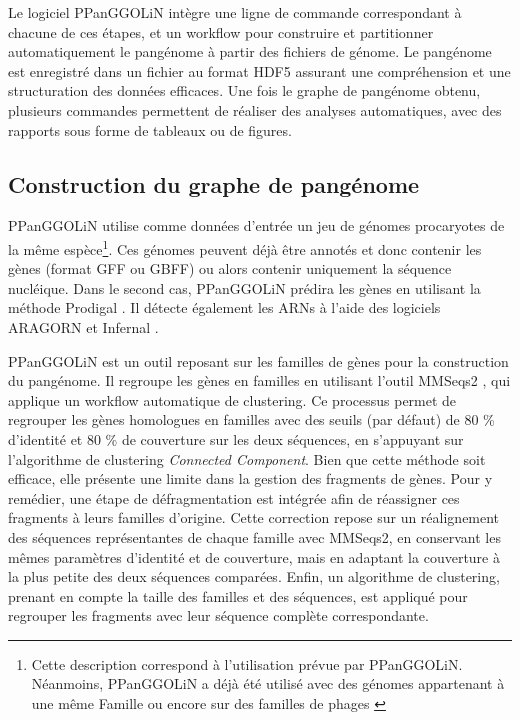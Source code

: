 Le logiciel PPanGGOLiN intègre une ligne de commande correspondant à chacune de ces étapes, et un workflow pour construire et partitionner automatiquement le pangénome à partir des fichiers de génome. Le pangénome est enregistré dans un fichier au format HDF5 assurant une compréhension et une structuration des données efficaces. Une fois le graphe de pangénome obtenu, plusieurs commandes permettent de réaliser des analyses automatiques, avec des rapports sous forme de tableaux ou de figures.

\newpage
\subsection{Construction du graphe de pangénome}

PPanGGOLiN utilise comme données d'entrée un jeu de génomes procaryotes de la même espèce\footnote{Cette description correspond à l'utilisation prévue par PPanGGOLiN. Néanmoins, PPanGGOLiN a déjà été utilisé avec des génomes appartenant à une même Famille ou encore sur des familles de phages \cite{pfeifer_bacteria_2021}}. Ces génomes peuvent déjà être annotés et donc contenir les gènes (format GFF ou GBFF) ou alors contenir uniquement la séquence nucléique. Dans le second cas, PPanGGOLiN prédira les gènes en utilisant la méthode Prodigal \cite{hyatt_prodigal_2010}. Il détecte également les ARNs à l'aide des logiciels ARAGORN et Infernal \cite{laslett_aragorn_2004,nawrocki_infernal_2013}. 

PPanGGOLiN est un outil reposant sur les familles de gènes pour la construction du pangénome. Il regroupe les gènes en familles en utilisant l’outil MMSeqs2 \cite{steinegger_mmseqs2_2017}, qui applique un workflow automatique de clustering. Ce processus permet de regrouper les gènes homologues en familles avec des seuils (par défaut) de 80 \% d’identité \cite{fedrizzi_genomic_2017,iraola_distinct_2017,batty_long-read_2018} et 80 \% de couverture \cite{sjolander_ortholog_2011} sur les deux séquences, en s’appuyant sur l’algorithme de clustering \textit{Connected Component}. Bien que cette méthode soit efficace, elle présente une limite dans la gestion des fragments de gènes. Pour y remédier, une étape de défragmentation est intégrée afin de réassigner ces fragments à leurs familles d’origine. Cette correction repose sur un réalignement des séquences représentantes de chaque famille avec MMSeqs2, en conservant les mêmes paramètres d’identité et de couverture, mais en adaptant la couverture à la plus petite des deux séquences comparées. Enfin, un algorithme de clustering, prenant en compte la taille des familles et des séquences, est appliqué pour regrouper les fragments avec leur séquence complète correspondante.

